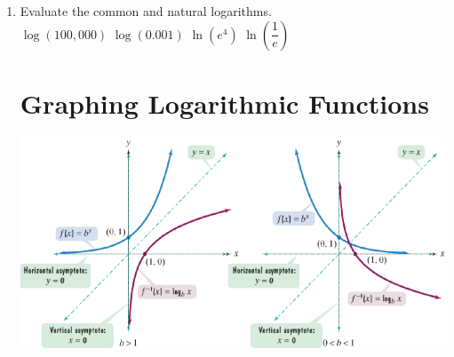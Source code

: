 \documentclass[11pt]{article}
\begin{document}
\begin{enumerate}
\item Evaluate the common and natural logarithms.\\
$\log (100,000)$  \hspace{1in} $\log (0.001)$  \hspace{1in} $\ln (e^4)$   \hspace{1in} $\ln \left(\dfrac{1}{e}\right)$ \\

\section{Graphing Logarithmic Functions}
\includegraphics{loggraph}\\


\end{enumerate}
\end{document}
